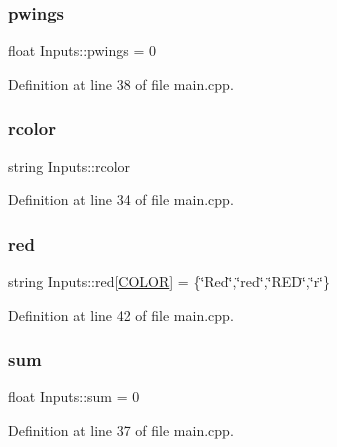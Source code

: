 \subsubsection{\texorpdfstring{pwings}{pwings}}
{\footnotesize\ttfamily float Inputs\+::pwings = 0}



Definition at line 38 of file main.\+cpp.

\mbox{\label{struct_inputs_a3b8bbe1d2d8f1736d88f6130e800ac16}} 
\subsubsection{\texorpdfstring{rcolor}{rcolor}}
{\footnotesize\ttfamily string Inputs\+::rcolor}



Definition at line 34 of file main.\+cpp.

\mbox{\label{struct_inputs_a7e6f084b57b2515a6d260d422b252f37}} 
\subsubsection{\texorpdfstring{red}{red}}
{\footnotesize\ttfamily string Inputs\+::red\mbox{[}\hyperlink{main_8cpp_aa6d8034c897057de595a4511a4e7a837}{C\+O\+L\+OR}\mbox{]} = \{\char`\"{}Red\char`\"{},\char`\"{}red\char`\"{},\char`\"{}R\+ED\char`\"{},\char`\"{}r\char`\"{}\}}



Definition at line 42 of file main.\+cpp.

\mbox{\label{struct_inputs_ab43ee7fc7282e8dadf5ae6d40453ccda}} 
\subsubsection{\texorpdfstring{sum}{sum}}
{\footnotesize\ttfamily float Inputs\+::sum = 0}



Definition at line 37 of file main.\+cpp.

\mbox{\label{struct_inputs_a890a399e0575f0ab410e101f3748d04a}} 
